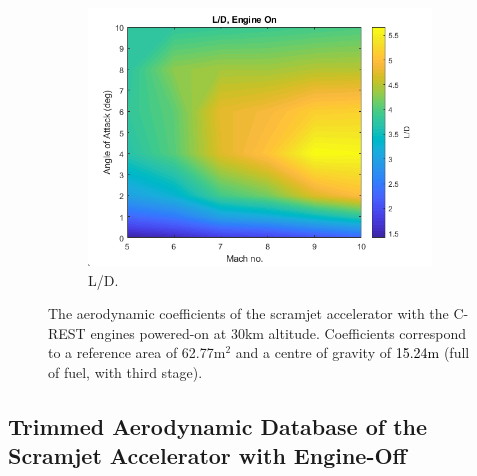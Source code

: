 \begin{figure}[ht]
\begin{subfigure}{.5\textwidth}
				\includegraphics[width=0.99\linewidth]{figures/3_vehicle_design/LD-EngineOn}
				\caption{L/D.}
				\label{fig:LD-EngineOn}
			\end{subfigure}
			\caption{The aerodynamic coefficients of the scramjet accelerator with the C-REST engines powered-on at 30km altitude. Coefficients correspond to a reference area of 62.77m$^2$ and a centre of gravity of \textcolor{black}{15.24m} (full of fuel, with third stage). }%
			\label{fig:EngineOnAero}
		\end{figure}
		
		

\subsection{Trimmed Aerodynamic Database of the Scramjet Accelerator with Engine-Off}\label{sec:trimmedongineoff}

